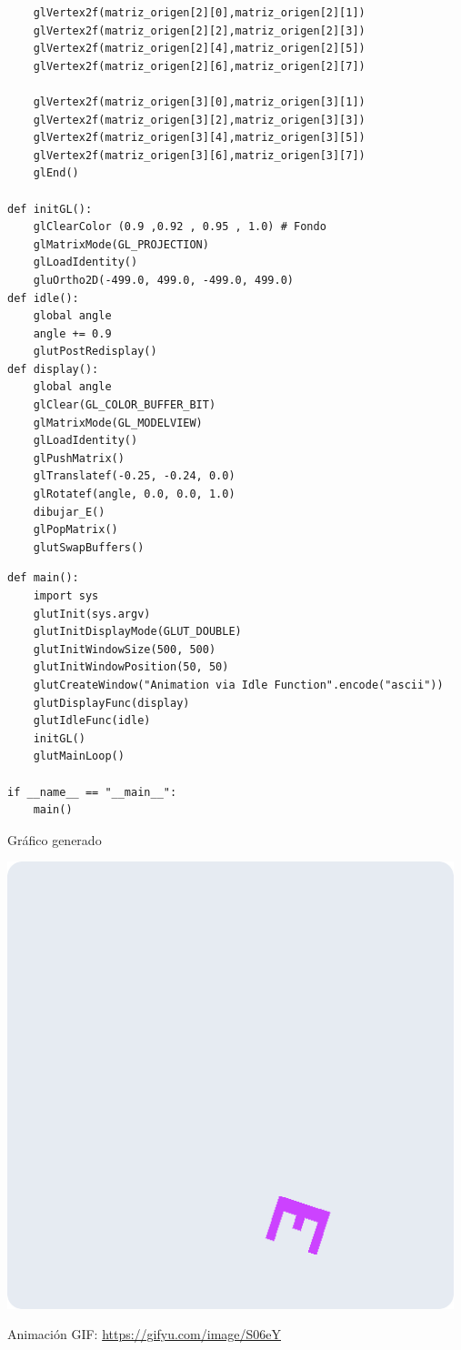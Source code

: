 \documentclass[a4paper]{article}
\begin{document}
\begin{center}
\begin{mycodeboxl}
\begin{lstlisting}
    glVertex2f(matriz_origen[2][0],matriz_origen[2][1])
    glVertex2f(matriz_origen[2][2],matriz_origen[2][3])
    glVertex2f(matriz_origen[2][4],matriz_origen[2][5])
    glVertex2f(matriz_origen[2][6],matriz_origen[2][7])

    glVertex2f(matriz_origen[3][0],matriz_origen[3][1])
    glVertex2f(matriz_origen[3][2],matriz_origen[3][3])
    glVertex2f(matriz_origen[3][4],matriz_origen[3][5])
    glVertex2f(matriz_origen[3][6],matriz_origen[3][7])
    glEnd()

def initGL():
    glClearColor (0.9 ,0.92 , 0.95 , 1.0) # Fondo 
    glMatrixMode(GL_PROJECTION)
    glLoadIdentity() 
    gluOrtho2D(-499.0, 499.0, -499.0, 499.0)
def idle():
    global angle
    angle += 0.9
    glutPostRedisplay()
def display():
    global angle
    glClear(GL_COLOR_BUFFER_BIT) 
    glMatrixMode(GL_MODELVIEW)  
    glLoadIdentity() 
    glPushMatrix()
    glTranslatef(-0.25, -0.24, 0.0)
    glRotatef(angle, 0.0, 0.0, 1.0) 
    dibujar_E()
    glPopMatrix()  
    glutSwapBuffers()  
\end{lstlisting}
\end{mycodeboxl}
\end{center}
\newpage
\begin{center}
\begin{mycodeboxl}
\begin{lstlisting}
def main():
    import sys
    glutInit(sys.argv)  
    glutInitDisplayMode(GLUT_DOUBLE)
    glutInitWindowSize(500, 500)
    glutInitWindowPosition(50, 50)
    glutCreateWindow("Animation via Idle Function".encode("ascii"))
    glutDisplayFunc(display)
    glutIdleFunc(idle) 
    initGL() 
    glutMainLoop()

if __name__ == "__main__":
    main()
\end{lstlisting}
\end{mycodeboxl}
\end{center}
Gráfico generado 
\begin{center}
\includegraphics[width=13cm]{./src/animacionE.png}
\end{center}
Animación GIF:
\url{https://gifyu.com/image/S06eY}
\newpage
\end{document}
